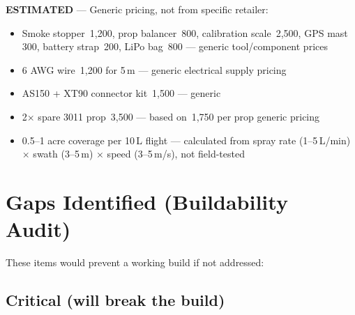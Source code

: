 \documentclass[11pt,a4paper]{article}
\newcommand{\Rs}{\rupee\,}
\begin{document}
\textbf{ESTIMATED} --- Generic pricing, not from specific retailer:
\begin{itemize}
  \item Smoke stopper \Rs{}1,200, prop balancer \Rs{}800, calibration scale \Rs{}2,500, GPS mast \Rs{}300, battery strap \Rs{}200, LiPo bag \Rs{}800 --- generic tool/component prices
  \item 6 AWG wire \Rs{}1,200 for 5\,m --- generic electrical supply pricing
  \item AS150 + XT90 connector kit \Rs{}1,500 --- generic
  \item 2$\times$ spare 3011 prop \Rs{}3,500 --- based on \Rs{}1,750 per prop generic pricing
  \item 0.5--1 acre coverage per 10\,L flight --- calculated from spray rate (1--5\,L/min) $\times$ swath (3--5\,m) $\times$ speed (3--5\,m/s), not field-tested
\end{itemize}

\section{Gaps Identified (Buildability Audit)}

These items would prevent a working build if not addressed:

\subsection{Critical (will break the build)}
\end{document}
